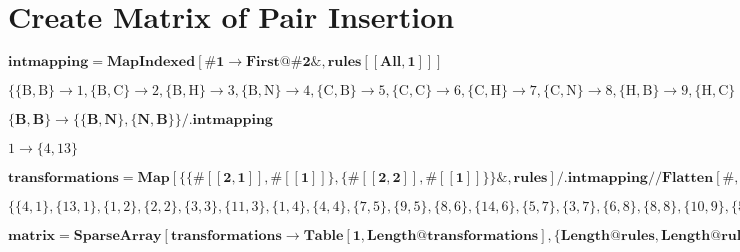 \documentclass{article}
\begin{document}
\section*{Create Matrix of Pair Insertion}

\begin{doublespace}
\noindent\(\pmb{\text{intmapping}=\text{MapIndexed}[\text{$\#$1}\to \text{First}@\text{$\#$2}\&,\text{rules}[[\text{All},1]]]}\)
\end{doublespace}

\begin{doublespace}
\noindent\(\{\{\text{B},\text{B}\}\to 1,\{\text{B},\text{C}\}\to 2,\{\text{B},\text{H}\}\to 3,\{\text{B},\text{N}\}\to 4,\{\text{C},\text{B}\}\to
5,\{\text{C},\text{C}\}\to 6,\{\text{C},\text{H}\}\to 7,\{\text{C},\text{N}\}\to 8,\{\text{H},\text{B}\}\to 9,\{\text{H},\text{C}\}\to 10,\{\text{H},\text{H}\}\to
11,\{\text{H},\text{N}\}\to 12,\{\text{N},\text{B}\}\to 13,\{\text{N},\text{C}\}\to 14,\{\text{N},\text{H}\}\to 15,\{\text{N},\text{N}\}\to 16\}\)
\end{doublespace}

\begin{doublespace}
\noindent\(\pmb{\{\text{B},\text{B}\}\to \{\{\text{B},\text{N}\},\{\text{N},\text{B}\}\}\text{/.}\text{intmapping}}\)
\end{doublespace}

\begin{doublespace}
\noindent\(1\to \{4,13\}\)
\end{doublespace}

\begin{doublespace}
\noindent\(\pmb{\text{transformations}=\text{Map}[\{\{\#[[2,1]],\#[[1]]\},\{\#[[2,2]],\#[[1]]\}\}\&,\text{rules}]\text{/.}\text{intmapping}\text{//}\text{Flatten}[\#,1]\&}\)
\end{doublespace}

\begin{doublespace}
\noindent\(\{\{4,1\},\{13,1\},\{1,2\},\{2,2\},\{3,3\},\{11,3\},\{1,4\},\{4,4\},\{7,5\},\{9,5\},\{8,6\},\{14,6\},\{5,7\},\{3,7\},\{6,8\},\{8,8\},\{10,9\},\{5,9\},\{9,10\},\{2,10\},\{12,11\},\{15,11\},\{10,12\},\{8,12\},\{13,13\},\{1,13\},\{13,14\},\{2,14\},\{14,15\},\{7,15\},\{14,16\},\{8,16\}\}\)
\end{doublespace}

\begin{doublespace}
\noindent\(\pmb{\text{matrix}=\text{SparseArray}[\text{transformations}\to \text{Table}[1,\text{Length}@\text{transformations}],\{\text{Length}@\text{rules},\text{Length}@\text{rules}\}]}\)
\end{doublespace}
\end{document}
